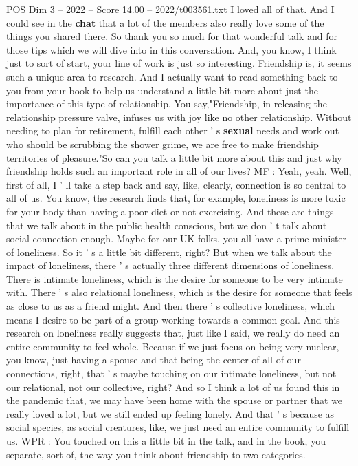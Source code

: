 \begin{textsample}{POS Dim 3 – 2022 – Score 14.00 – 2022/t003561.txt}
I loved all of that.
And I could see in the \textbf{chat} that a lot of the members also really love some of the things you shared there.
So thank you so much for that wonderful talk and for those tips which we will dive into in this conversation.
And, you know, I think just to sort of start, your line of work is just so interesting.
Friendship is, it seems such a unique area to research.
And I actually want to read something back to you from your book to help us understand a little bit more about just the importance of this type of relationship.
You say,"Friendship, in releasing the relationship pressure valve, infuses us with joy like no other relationship.
Without needing to plan for retirement, fulfill each other ' s \textbf{sexual} needs and work out who should be scrubbing the shower grime, we are free to make friendship territories of pleasure."So can you talk a little bit more about this and just why friendship holds such an important role in all of our lives?
MF : Yeah, yeah.
Well, first of all, I ' ll take a step back and say, like, clearly, connection is so central to all of us.
You know, the research finds that, for example, loneliness is more toxic for your body than having a poor diet or not exercising.
And these are things that we talk about in the public health conscious, but we don ' t talk about social connection enough.
Maybe for our UK folks, you all have a prime minister of loneliness.
So it ' s a little bit different, right?
But when we talk about the impact of loneliness, there ' s actually three different dimensions of loneliness.
There is intimate loneliness, which is the desire for someone to be very intimate with.
There ' s also relational loneliness, which is the desire for someone that feels as close to us as a friend might.
And then there ' s collective loneliness, which means I desire to be part of a group working towards a common goal.
And this research on loneliness really suggests that, just like I said, we really do need an entire community to feel whole.
Because if we just focus on being very nuclear, you know, just having a spouse and that being the center of all of our connections, right, that ' s maybe touching on our intimate loneliness, but not our relational, not our collective, right?
And so I think a lot of us found this in the pandemic that, we may have been home with the spouse or partner that we really loved a lot, but we still ended up feeling lonely.
And that ' s because as social species, as social creatures, like, we just need an entire community to fulfill us.
WPR : You touched on this a little bit in the talk, and in the book, you separate, sort of, the way you think about friendship to two categories.

\end{textsample}
